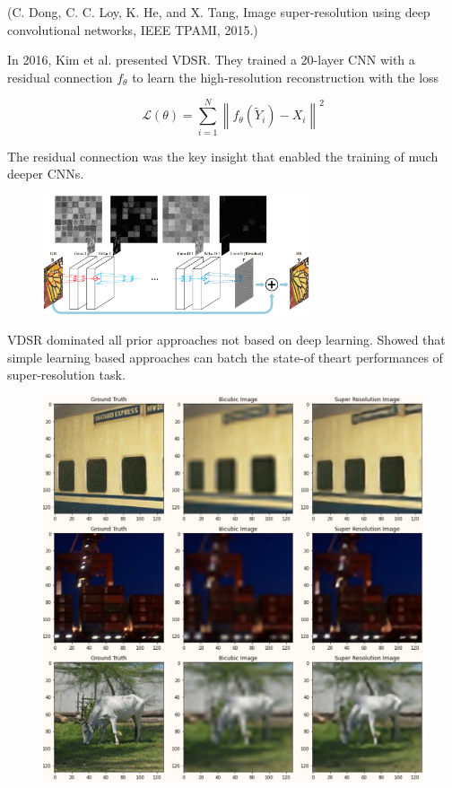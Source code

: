 \begin{definition}[8.6][SRCNN]
    (C. Dong, C. C. Loy, K. He, and X. Tang, Image super-resolution using deep convolutional networks, IEEE TPAMI, 2015.)
\end{definition}

\begin{definition}[8.7][VDSR]
    In 2016, Kim et al. presented VDSR. They trained a 20-layer CNN with a residual connection $f_{\theta}$ to learn the high-resolution reconstruction with the loss

    $$
    \mathcal{L}(\theta)=\sum_{i=1}^{N}\left\|f_{\theta}\left(\tilde{Y}_{i}\right)-X_{i}\right\|^{2}
    $$

    The residual connection was the key insight that enabled the training of much deeper CNNs.

    \begin{figure}[H]
        \centering
        \includegraphics[width=0.7\textwidth]{.././assets/8.5.png}
    \end{figure}

    \par\noindent\textcolor{gray}{\hdashrule{\textwidth}{0.4pt}{1pt 2pt}}

    VDSR dominated all prior approaches not based on deep learning.
    Showed that simple learning based approaches can batch the state-of theart performances of super-resolution task.

    \begin{figure}[H]
        \centering
        \includegraphics[width=1.0\textwidth]{.././assets/8.6.png}
    \end{figure}


\end{definition}
